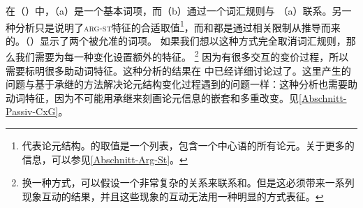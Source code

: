 \eal
\ex {}
\ex {}
\zl
在（）中，（a）是一个基本词项，而（b）通过一个词汇规则与 （a）联系。另一种分析只是说明了\textsc{arg-st}特征的合适取值\footnote{%
\argstc 代表论元结构。\argstc 的取值是一个列表，包含一个中心语的所有论元。关于\argstc 更多的信息，可以参见\ref{Abschnitt-Arg-St}。
}，而\subcatc 和\slashvc 都是通过相关限制从\argstvc 推导而来的。（）显示了两个被允准的词项。
\eal
\ex {}
\ex {}
\zl
如果我们想以这种方式完全取消词汇规则，那么我们需要为每一种变化设置额外的特征。 \footnote{%
换一种方式，可以假设一个非常复杂的关系来联系\argstc 和\subcatc。但是这必须带来一系列现象互动的结果，并且这些现象的互动无法用一种明显的方式表征。%
} 因为有很多交互的变价过程，所以需要标明很多助动词特征。这种分析的结果在 中已经详细讨论过了。这里产生的问题与基于承继的方法解决论元结构变化过程遇到的问题一样：这种分析也需要助动词特征，因为不可能用承继来刻画论元信息的嵌套和多重改变。见\ref{Abschnitt-Passiv-CxG}。

